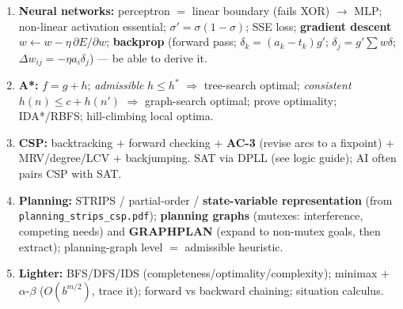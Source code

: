 \documentclass[11pt,a4paper]{article}
\begin{document}
\begin{must}
\begin{enumerate}[leftmargin=*,itemsep=2pt]
  \item \textbf{Neural networks:} perceptron $=$ linear boundary (fails XOR) $\to$ MLP; non-linear activation essential; $\sigma'=\sigma(1-\sigma)$; SSE loss; \textbf{gradient descent} $w\leftarrow w-\eta\,\partial E/\partial w$; \textbf{backprop} (forward pass; $\delta_k=(a_k-t_k)g'$; $\delta_j=g'\sum w\delta$; $\Delta w_{ij}=-\eta a_i\delta_j$) --- be able to derive it.
  \item \textbf{A*:} $f=g+h$; \emph{admissible} $h\le h^*$ $\Rightarrow$ tree-search optimal; \emph{consistent} $h(n)\le c+h(n')$ $\Rightarrow$ graph-search optimal; prove optimality; IDA*/RBFS; hill-climbing local optima.
  \item \textbf{CSP:} backtracking $+$ forward checking $+$ \textbf{AC-3} (revise arcs to a fixpoint) $+$ MRV/degree/LCV $+$ backjumping. SAT via DPLL (see logic guide); AI often pairs CSP with SAT.
  \item \textbf{Planning:} STRIPS / partial-order / \textbf{state-variable representation} (from \texttt{planning\_strips\_csp.pdf}); \textbf{planning graphs} (mutexes: interference, competing needs) and \textbf{GRAPHPLAN} (expand to non-mutex goals, then extract); planning-graph level $=$ admissible heuristic.
  \item \textbf{Lighter:} BFS/DFS/IDS (completeness/optimality/complexity); minimax $+$ $\alpha$-$\beta$ ($O(b^{m/2})$, trace it); forward vs backward chaining; situation calculus.
\end{enumerate}
\end{must}
\end{document}
